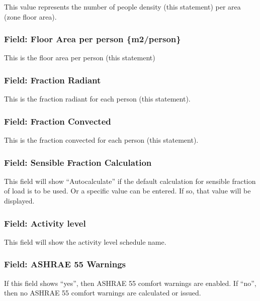This value represents the number of people density (this statement) per area (zone floor area).

\subsubsection{Field: Floor Area per person \{m2/person\}}\label{field-floor-area-per-person-m2person}

This is the floor area per person (this statement)

\subsubsection{Field: Fraction Radiant}\label{field-fraction-radiant}

This is the fraction radiant for each person (this statement).

\subsubsection{Field: Fraction Convected}\label{field-fraction-convected}

This is the fraction convected for each person (this statement).

\subsubsection{Field: Sensible Fraction Calculation}\label{field-sensible-fraction-calculation}

This field will show ``Autocalculate'' if the default calculation for sensible fraction of load is to be used. Or a specific value can be entered. If so, that value will be displayed.

\subsubsection{Field: Activity level}\label{field-activity-level}

This field will show the activity level schedule name.

\subsubsection{Field: ASHRAE 55 Warnings}\label{field-ashrae-55-warnings}

If this field shows ``yes'', then ASHRAE 55 comfort warnings are enabled. If ``no'', then no ASHRAE 55 comfort warnings are calculated or issued.

